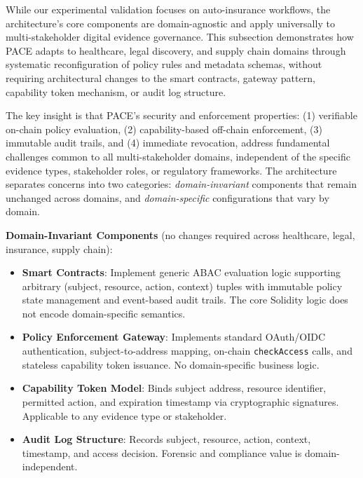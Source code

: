 \documentclass[pdflatex,sn-mathphys-num]{sn-jnl}
\begin{document}
While our experimental validation focuses on auto-insurance workflows, the architecture's core components are domain-agnostic and apply universally to multi-stakeholder digital evidence governance. This subsection demonstrates how PACE adapts to healthcare, legal discovery, and supply chain domains through systematic reconfiguration of policy rules and metadata schemas, without requiring architectural changes to the smart contracts, gateway pattern, capability token mechanism, or audit log structure.

The key insight is that PACE's security and enforcement properties: (1) verifiable on-chain policy evaluation, (2) capability-based off-chain enforcement, (3) immutable audit trails, and (4) immediate revocation, address fundamental challenges common to all multi-stakeholder domains, independent of the specific evidence types, stakeholder roles, or regulatory frameworks. The architecture separates concerns into two categories: \textit{domain-invariant} components that remain unchanged across domains, and \textit{domain-specific} configurations that vary by domain.

\textbf{Domain-Invariant Components} (no changes required across healthcare, legal, insurance, supply chain):
\begin{itemize}
	\item \textbf{Smart Contracts}: Implement generic ABAC evaluation logic supporting arbitrary (subject, resource, action, context) tuples with immutable policy state management and event-based audit trails. The core Solidity logic does not encode domain-specific semantics.
	
	\item \textbf{Policy Enforcement Gateway}: Implements standard OAuth/OIDC authentication, subject-to-address mapping, on-chain \texttt{checkAccess} calls, and stateless capability token issuance. No domain-specific business logic.
	
	\item \textbf{Capability Token Model}: Binds subject address, resource identifier, permitted action, and expiration timestamp via cryptographic signatures. Applicable to any evidence type or stakeholder.
	
	\item \textbf{Audit Log Structure}: Records subject, resource, action, context, timestamp, and access decision. Forensic and compliance value is domain-independent.
\end{itemize}
\end{document}
